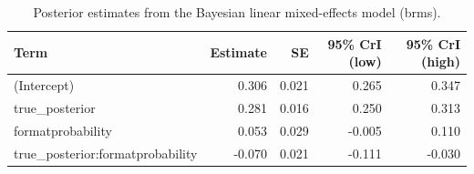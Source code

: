\begin{table}
\centering
\caption{Posterior estimates from the Bayesian linear mixed-effects model (brms).}
\centering
\fontsize{10}{12}\selectfont
\begin{tabular}[t]{lrrrr}
\toprule
Term & Estimate & SE & 95\% CrI (low) & 95\% CrI (high)\\
\midrule
(Intercept) & 0.306 & 0.021 & 0.265 & 0.347\\
true\_posterior & 0.281 & 0.016 & 0.250 & 0.313\\
formatprobability & 0.053 & 0.029 & -0.005 & 0.110\\
true\_posterior:formatprobability & -0.070 & 0.021 & -0.111 & -0.030\\
\bottomrule
\end{tabular}
\end{table}
